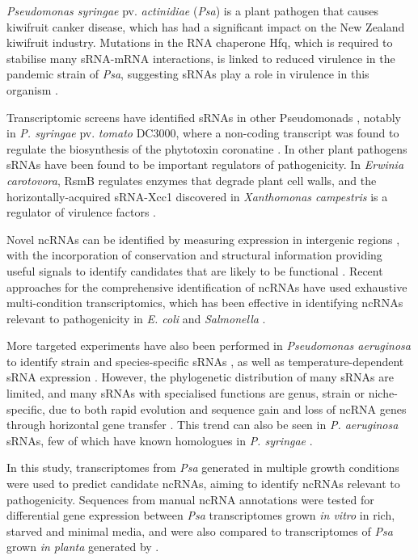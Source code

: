 \textit{Pseudomonas syringae} pv. \textit{actinidiae} (\textit{Psa}) is a plant pathogen that causes kiwifruit canker disease, which has had a significant impact on the New Zealand kiwifruit industry. Mutations in the RNA chaperone Hfq, which is required to stabilise many sRNA-mRNA interactions, is linked to reduced virulence in the pandemic strain of \textit{Psa}, suggesting sRNAs play a role in virulence in this organism \citep{Zhao2019}.

Transcriptomic screens have identified sRNAs in other Pseudomonads \citep{GomezLozano_2012,GomezLozano_2015}, notably in \textit{P. syringae} pv. \textit{tomato} DC3000, where a non-coding transcript was found to regulate the biosynthesis of the phytotoxin coronatine \citep{Filiatrault_2010x,Geng2014-jh}. In other plant pathogens sRNAs have been found to be important regulators of pathogenicity. In \textit{Erwinia carotovora}, RsmB regulates enzymes that degrade plant cell walls, and the horizontally-acquired sRNA-Xcc1 discovered in \textit{Xanthomonas campestris} is a regulator of virulence factors \citep{Liu_1998x,Chen_Tang_2011x}. 

Novel ncRNAs can be identified by measuring expression in intergenic regions \citep{Rath_Pitman_Cho_Bai_2017x,Lindgreen_Umu_2014x}, with the incorporation of conservation and structural information providing useful signals to identify candidates that are likely to be functional \citep{Stav_Atilho_Mirihana_2019x}. Recent approaches for the comprehensive identification of ncRNAs have used exhaustive multi-condition transcriptomics, which has been effective in identifying ncRNAs relevant to pathogenicity in \textit{E. coli} \citep{Rau2015-xxgt} and \textit{Salmonella} \citep{Kroger_Hokamp_2013x}.

More targeted experiments have also been performed in \textit{Pseudomonas aeruginosa} to identify strain and species-specific sRNAs \citep{Ferrara_2012x}, as well as temperature-dependent sRNA expression \citep{Wurtzel_Lory_2012x}. However, the phylogenetic distribution of many sRNAs are limited, and many sRNAs with specialised functions are genus, strain or niche-specific, due to both rapid evolution and sequence gain and loss of ncRNA genes through horizontal gene transfer \citep{Jose2019-xxxu}. This trend can also be seen in \textit{P. aeruginosa} sRNAs, few of which have known homologues in \textit{P. syringae} \citep{GomezLozano_2015}.

In this study, transcriptomes from \textit{Psa} generated in multiple growth conditions were used to predict candidate ncRNAs, aiming to identify ncRNAs relevant to pathogenicity. Sequences from manual ncRNA annotations were tested for differential gene expression between \textit{Psa} transcriptomes grown \textit{in vitro} in rich, starved and minimal media, and were also compared to transcriptomes of \textit{Psa} grown \textit{in planta} generated by \cite{McAtee_2018x}.

